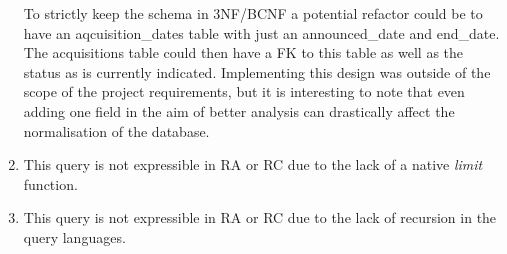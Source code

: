 \documentclass[12pt]{article}
\begin{document}
\begin{enumerate}
To strictly keep the schema in 3NF/BCNF a potential refactor could be to have an aqcuisition\_dates table with just an announced\_date and end\_date. The acquisitions table could then have a FK to this table as well as the status as is currently indicated. Implementing this design was outside of the scope of the project requirements, but it is interesting to note that even adding one field in the aim of better analysis can drastically affect the normalisation of the database.

  \item\label{part1} This query is not expressible in RA or RC due to the lack of a native \emph{limit} function.
  \item\label{part1} This query is not expressible in RA or RC due to the lack of recursion in the query languages.
  \end{enumerate}
\end{document}
